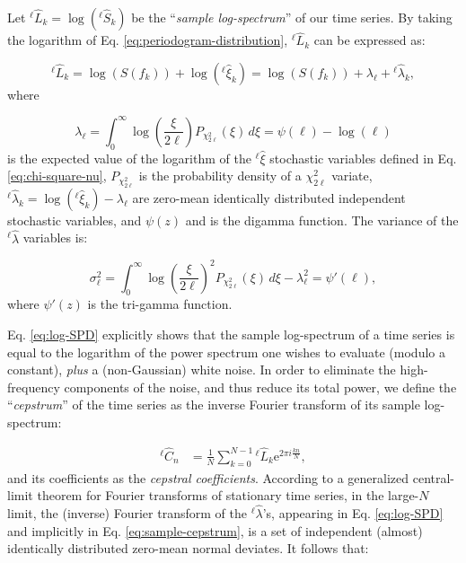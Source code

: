Let  $^{\ell}\hat{L}_{k} =\log (^{\ell} \hat{S}_{k} )$ be the ``\emph{sample log-spectrum}'' of our time series. By taking the logarithm of Eq. \eqref{eq:periodogram-distribution}, $^{\ell}\hat{L}_{k}$ can be expressed as:

\begin{equation}
^\ell\hat{L}_{k} = \log\left(S(f_k) \right) + \log\left( ^\ell{\hat\xi}_k\right) = \log\left(S(f_k) \right) + \lambda_\ell + {^{\ell}\hat{\lambda}}_{k}, \label{eq:log-SPD}
\end{equation}
where 

\begin{equation}
\lambda_{\ell} = \int_0^\infty \log\left (\frac{\xi}{2\ell}\right ) P_{\chi^2_{2\ell}}(\xi) \, d\xi = \psi(\ell)-\log(\ell) \label{eq:lambda-ell}
\end{equation}
is the expected value of the logarithm of the ${^\ell}\hat\xi$ stochastic variables defined in Eq. \eqref{eq:chi-square-nu}, $P_{\chi^2_{2\ell}}$ is the probability density of a $\chi^2_{2\ell}$ variate, $^{\ell}\hat{\lambda}_k = \log\left( ^\ell{\hat\xi}_k\right)  - \lambda_\ell$ are zero-mean identically distributed independent stochastic variables, and $\psi(z)$ and is the digamma function.\cite{PolyGamma}
The variance of the ${^\ell}\hat\lambda$ variables is:

\begin{equation}
\sigma_{\ell}^{2}  = \int_0^\infty \log\left (\frac{\xi}{2\ell}\right )^2 P_{\chi^2_{2\ell}}(\xi) \, d\xi - \lambda_{\ell}^2 =\psi'(\ell),\label{eq:sigma2-ell}
\end{equation}
where $\psi'(z)$ is the tri-gamma function.\cite{PolyGamma} 

Eq. \eqref{eq:log-SPD} explicitly shows that the sample log-spectrum of a  time series is equal to the logarithm  of the power spectrum one wishes to evaluate (modulo a constant), \emph{plus} a (non-Gaussian) white noise. In order to eliminate the high-frequency components of the noise, and thus reduce its total power, we define the ``\emph{cepstrum}'' of the time series as the inverse Fourier transform of its sample log-spectrum:\cite{Childers1977}

\begin{align}
^{\ell} \hat C_{n} &= \frac{1}{N}\sum_{k=0}^{N-1} {^{\ell} \hat L_{k}}\mathrm{e}^{2\pi i\frac{kn}{N}}, 
 \label{eq:sample-cepstrum}
\end{align}
and its coefficients as the \emph{cepstral coefficients}. According to a generalized central-limit theorem  for Fourier transforms of stationary time series,\cite{Peligrad2010} in the large-$N$ limit, the (inverse) Fourier transform of the $^\ell{\hat {\lambda}}$'s, appearing in Eq. \eqref{eq:log-SPD} and implicitly in Eq. \eqref{eq:sample-cepstrum}, is a set of independent (almost) identically distributed zero-mean normal deviates. It follows that:

